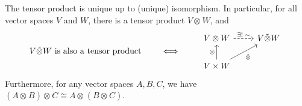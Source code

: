 \documentclass[twoside,10pt]{article}
\begin{document}
\begin{thrm}[]
	The tensor product is unique up to (unique) isomorphism. In particular, for all vector spaces $ V$ and $ W$, there is a tensor product $V \otimes_{}W$, and
	\begin{equation*}
        \begin{aligned}[c]
                V \tilde{\otimes} W \text{ is also a tensor product}
        \end{aligned}
        \qquad\iff\qquad
        \begin{aligned}[c]
                \begin{tikzcd}
                        V \otimes W \rar[dashed]{\exists!\;\sim} & V \tilde{\otimes} W \\
                        V\times W \uar{\otimes}\arrow[ur,"\tilde{\otimes}"']
                \end{tikzcd}
        \end{aligned}
        \end{equation*}
	Furthermore, for any vector spaces $A,B,C$, we have $(A \otimes_{}B)\otimes_{}C \cong A \otimes_{}(B \otimes_{}C)$.
\end{thrm}
\end{document}
